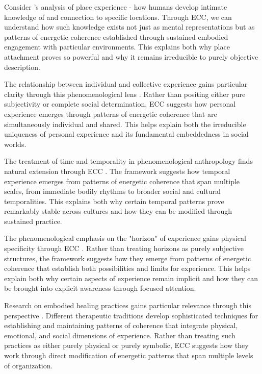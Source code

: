 \begin{refsection}
Consider \cite{casey1996space}'s analysis of place experience - how humans develop intimate knowledge of and connection to specific locations. Through ECC, we can understand how such knowledge exists not just as mental representations but as patterns of energetic coherence established through sustained embodied engagement with particular environments. This explains both why place attachment proves so powerful and why it remains irreducible to purely objective description.

The relationship between individual and collective experience gains particular clarity through this phenomenological lens \cite{thompson2007mind}. Rather than positing either pure subjectivity or complete social determination, ECC suggests how personal experience emerges through patterns of energetic coherence that are simultaneously individual and shared. This helps explain both the irreducible uniqueness of personal experience and its fundamental embeddedness in social worlds.

The treatment of time and temporality in phenomenological anthropology finds natural extension through ECC \cite{throop2003articulating}. The framework suggests how temporal experience emerges from patterns of energetic coherence that span multiple scales, from immediate bodily rhythms to broader social and cultural temporalities. This explains both why certain temporal patterns prove remarkably stable across cultures and how they can be modified through sustained practice.

The phenomenological emphasis on the "horizon" of experience gains physical specificity through ECC \cite{zahavi2003husserl}. Rather than treating horizons as purely subjective structures, the framework suggests how they emerge from patterns of energetic coherence that establish both possibilities and limits for experience. This helps explain both why certain aspects of experience remain implicit and how they can be brought into explicit awareness through focused attention.

Research on embodied healing practices gains particular relevance through this perspective \cite{csordas1993somatic}. Different therapeutic traditions develop sophisticated techniques for establishing and maintaining patterns of coherence that integrate physical, emotional, and social dimensions of experience. Rather than treating such practices as either purely physical or purely symbolic, ECC suggests how they work through direct modification of energetic patterns that span multiple levels of organization.


\end{refsection}
